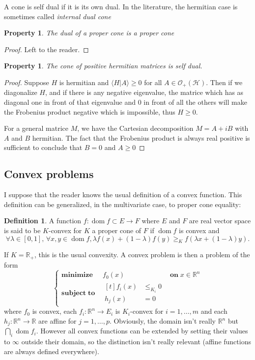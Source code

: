 \documentclass[10pt,a4paper]{report}
\theoremstyle{plain}
\newtheorem{prop}[thm]{Property}
\theoremstyle{definition}
\newtheorem{defn}{Definition}[chapter]
\theoremstyle{remark}
\newcommand{\R}{\ensuremath{\mathbb{R}}}
\renewcommand{\geq}{\geqslant}
\renewcommand{\leq}{\leqslant}
\DeclareMathOperator{\dom}{dom}
\newcommand{\minima}[3]{\begin{cases}
    \mathbf{minimize}\;\,\quad #1& \mathbf{on}\; #2\\
    \mathbf{subject\;to}\quad \begin{aligned}[t]#3\end{aligned}
  \end{cases}}
\begin{document}
A cone is self dual if it is its own dual. In the literature, the hermitian case
is sometimes called \emph{internal dual cone}

\begin{prop}
  The dual of a proper cone is a proper cone
\end{prop}

\begin{proof}
  Left to the reader.
\end{proof}

\begin{prop}
  The cone of positive hermitian matrices is self dual.
\end{prop}

\begin{proof}
  Suppose $H$ is hermitian and $\langle H | A \rangle \geq 0$ for all $A \in
  \mathcal{O}_+(\mathcal{H})$. Then if we diagonalize $H$, and if there is any
  negative eigenvalue, the matrice which has as diagonal one in front of that
  eigenvalue and 0 in front of all the others will make the Frobenius product negative
  which is impossible, thus $H \geq 0$.

  For a general matrice $M$, we have the Cartesian decomposition $M = A + iB$
  with $A$ and $B$ hermitian. The fact that the Frobenius product is always real
  positive is sufficient to conclude that $B = 0$ and $A \geq 0$
\end{proof}


\subsection{Convex problems}

I suppose that the reader knows the usual definition of a convex function.
This definition can be generalized, in the multivariate case, to proper cone equality:

\begin{defn}
  A function $f : \dom f \subset E \to F$ where $E$ and $F$ are real vector
  space is said to be $K$-convex for $K$ a proper cone of $F$ if $\dom f$ is
  convex and
  \[\forall \lambda \in [0,1],\, \forall x,y \in \dom f, \lambda f(x) + (1 -
    \lambda)f(y) \geq_K f(\lambda x + (1-\lambda)y).\]
\end{defn}
If $K = \R_+$, this is the usual convexity. A convex problem is then a problem
of the form
\begin{equation}\label{eqn:stdprb}
\minima{f_0(x)}{x \in \R^n}{f_i(x) &\leq_{K_i}0 \\ \!\!h_j(x) &= 0}
\end{equation}
where $f_0$ is convex, each $f_i : \R^n \to E_i$ is $K_i$-convex for $i = 1,\ldots,m$ and each
$h_j : \R^n \to \R$ are affine for $j = 1,\ldots,p$. Obviously, the domain isn't really $\R^n$
but $\bigcap_i \dom f_i$. However all convex
functions can be extended by setting their values to $\infty$ outside their domain,
so the distinction isn't really relevant (affine functions are always defined
everywhere).
\end{document}
